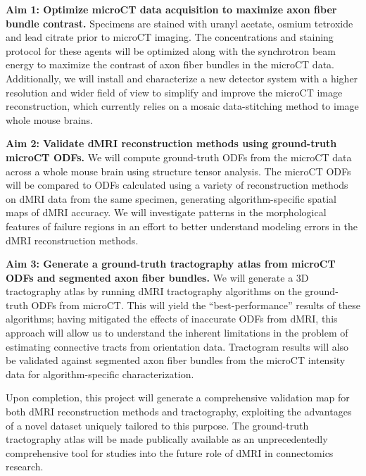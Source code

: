 \documentclass[11pt]{article}
\begin{document}
\noindent\textbf{Aim 1: Optimize microCT data acquisition to maximize axon fiber bundle contrast.}
Specimens are stained with uranyl acetate, osmium tetroxide and lead citrate
prior to microCT imaging. The concentrations and staining protocol for these
agents will be optimized along with the synchrotron beam energy to maximize the
contrast of axon fiber bundles in the microCT data. Additionally, we will
install and characterize a new detector system with a higher resolution and
wider field of view to simplify and improve the microCT image reconstruction,
which currently relies on a mosaic data-stitching method to image whole mouse
brains.

\noindent\textbf{Aim 2: Validate dMRI reconstruction methods using ground-truth
  microCT ODFs.}
We will compute ground-truth ODFs from the microCT data across a whole mouse
brain using structure tensor analysis. The microCT ODFs will be compared to ODFs
calculated using a variety of reconstruction methods on dMRI data from the same
specimen, generating algorithm-specific spatial maps of dMRI accuracy. We will
investigate patterns in the morphological features of failure regions in an
effort to better understand modeling errors in the dMRI reconstruction methods.

\noindent\textbf{Aim 3: Generate a ground-truth tractography atlas from microCT
  ODFs and segmented axon fiber bundles.} We will generate a 3D tractography atlas
by running dMRI tractography algorithms on the ground-truth ODFs from
microCT. This will yield the ``best-performance'' results of these algorithms;
having mitigated the effects of inaccurate ODFs from dMRI, this approach will
allow us to understand the inherent limitations in the problem of estimating
connective tracts from orientation data.  Tractogram results will also be validated
against segmented axon fiber bundles from the microCT intensity data for
algorithm-specific characterization.

Upon completion, this project will generate a comprehensive validation map for
both dMRI reconstruction methods and tractography, exploiting the advantages of
a novel dataset uniquely tailored to this purpose. The ground-truth tractography
atlas will be made publically available as an unprecedentedly comprehensive tool
for studies into the future role of dMRI in connectomics research.
\end{document}
